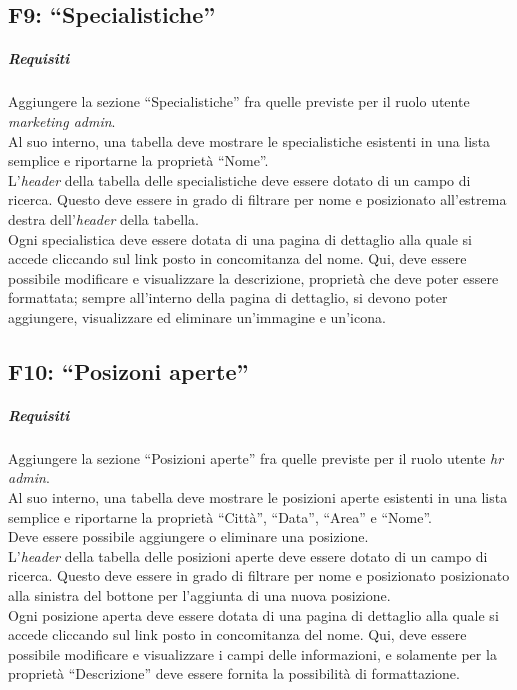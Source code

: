 \subsection{F9: “Specialistiche”}
\subparagraph{Requisiti}
Aggiungere la sezione “Specialistiche” fra quelle previste per il ruolo utente \textit{marketing admin}.\\
Al suo interno, una tabella deve mostrare le specialistiche esistenti in una lista semplice e riportarne la proprietà “Nome”.\\
L'\textit{header} della tabella delle specialistiche deve essere dotato di un campo di ricerca. Questo deve essere in grado di filtrare per nome e posizionato all'estrema destra dell'\textit{header} della tabella.\\
Ogni specialistica deve essere dotata di una pagina di dettaglio alla quale si accede cliccando sul link posto in concomitanza del nome. Qui, deve essere possibile modificare e visualizzare la descrizione, proprietà che deve poter essere formattata; sempre all'interno della pagina di dettaglio, si devono poter aggiungere, visualizzare ed eliminare un'immagine e un'icona.

\subsection{F10: “Posizoni aperte”}
\subparagraph{Requisiti}
Aggiungere la sezione “Posizioni aperte” fra quelle previste per il ruolo utente \textit{hr admin}.\\
Al suo interno, una tabella deve mostrare le posizioni aperte esistenti in una lista semplice e riportarne la proprietà “Città”, “Data”, “Area” e “Nome”.\\
Deve essere possibile aggiungere o eliminare una posizione.\\
L'\textit{header} della tabella delle posizioni aperte deve essere dotato di un campo di ricerca. Questo deve essere in grado di filtrare per nome e posizionato posizionato alla sinistra del bottone per l'aggiunta di una nuova posizione.\\
Ogni posizione aperta deve essere dotata di una pagina di dettaglio alla quale si accede cliccando sul link posto in concomitanza del nome. Qui, deve essere possibile modificare e visualizzare i campi delle informazioni, e solamente per la proprietà “Descrizione” deve essere fornita la possibilità di formattazione.

